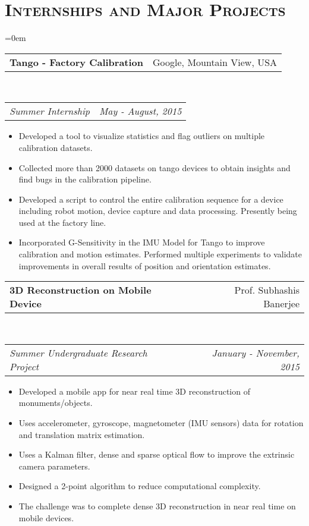 \documentclass{article}
\makeatletter
\newcommand{\headerrow}[2]
{\begin{tabular*}{\linewidth}{l@{\extracolsep{\fill}}r}
	#1 &
	#2 \\
\end{tabular*}}
\newcommand{\tmpsection}[1]{}
\let\tmpsection=\section
\renewcommand{\section}[1]{\tmpsection*{\textsc{#1}}}
\makeatother
\begin{document}
\section{Internships and Major Projects}
\begin{list} {}{\leftmargin=0em}
\setlength{\leftmargin}{0pt}
\item[]
  \headerrow
    {\textbf{Tango - Factory Calibration}}
    {Google, Mountain View, USA}
  \\
  \headerrow
    {\emph{Summer Internship}}
    {\emph{May - August, 2015}}
      \begin{itemize}
        \item Developed a tool to visualize statistics and flag outliers on multiple calibration datasets. 
        \item Collected more than 2000 datasets on tango devices to obtain insights and find bugs in the calibration pipeline.
        \item Developed a script to control the entire calibration sequence for a device including robot motion, device capture and data processing. Presently being used at the factory line.
        \item Incorporated G-Sensitivity in the IMU Model for Tango to improve calibration and motion estimates. Performed multiple experiments to validate improvements in overall results of position and orientation estimates.
      \end{itemize}

\item[]
  \headerrow
    {\textbf{3D Reconstruction on Mobile Device}}
    {Prof. Subhashis Banerjee}
  \\
  \headerrow
    {\emph{Summer Undergraduate Research Project}}
    {\emph{January - November, 2015}}
      \begin{itemize}
        \item Developed a mobile app for near real time 3D reconstruction of monuments/objects.
        \item Uses accelerometer, gyroscope, magnetometer (IMU sensors) data for rotation and translation matrix estimation. 
        \item Uses a Kalman filter, dense and sparse optical flow to improve the extrinsic camera parameters. 
        \item Designed a 2-point algorithm to reduce computational complexity. 
        \item The challenge was to complete dense 3D reconstruction in near real time on mobile devices.
      \end{itemize}


\end{list}
\end{document}
